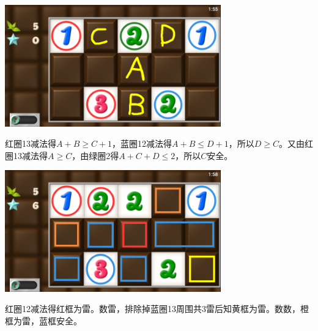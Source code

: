 \subsection{} %
\begin{center}
    \includegraphics[width=0.7\textwidth]{puzzle/89-1.png}
\end{center}
红圈13减法得$A+B\ge C+1$，蓝圈12减法得$A+B\le D+1$，所以$D\ge C$。又由红圈13减法得$A\ge C$，由绿圈2得$A+C+D\le 2$，所以$C$安全。
\begin{center}
    \includegraphics[width=0.7\textwidth]{puzzle/89-2.png}
\end{center}
红圈12减法得红框为雷。数雷，排除掉蓝圈13周围共3雷后知黄框为雷。数数，橙框为雷，蓝框安全。

